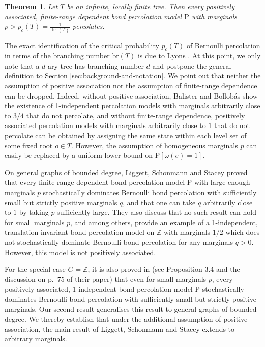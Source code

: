 \documentclass[11pt]{article}
\renewcommand{\P}{\mathrm{P}}
\newcommand{\Z}{\mathbb{Z}}
\DeclareMathOperator{\br}{br}
\newtheorem{theorem}{Theorem}
\theoremstyle{remark}
\begin{document}
\begin{theorem}\label{thm:trees}
	Let $T$ be an infinite, locally finite tree. Then every positively associated, finite-range dependent bond percolation model $\P$ with marginals $p>p_c(T) = \frac{1}{\br(T)}$ percolates.
\end{theorem}
The exact identification of the critical probability $p_c(T)$ of Bernoulli percolation in terms of the branching number $\text{br}(T)$ is due to Lyons \cite{Lyons1990}. At this point, we only note that a $d$-ary tree has branching number $d$ and postpone the general definition to Section \ref{sec:background-and-notation}.
We point out that neither the assumption of positive association nor the assumption of finite-range dependence can be dropped. Indeed, without positive association, Balister and Bollobás \cite{Balister2012} show the existence of 1-independent percolation models with marginals arbitrarily close to $3/4$ that do not percolate, and without finite-range dependence, positively associated percolation models with marginals arbitrarily close to $1$ that do not percolate can be obtained by assigning the same state within each level set of some fixed root $o\in T$. However, the assumption of homogeneous marginals $p$ can easily be replaced by a uniform lower bound on $\mathrm{P}[\omega(e)=1]$.

On general graphs of bounded degree, Liggett, Schonmann and Stacey \cite{Liggett1997} proved that every finite-range dependent bond percolation model $\P$ with large enough marginals $p$ stochastically dominates Bernoulli bond percolation with sufficiently small but strictly positive marginals $q$, and that one can take $q$ arbitrarily close to $1$ by taking $p$ sufficiently large. They also discuss that no such result can hold for small marginals $p$, and among others, provide an example of a 1-independent, translation invariant bond percolation model on $\Z$ with marginals $1/2$ which does not stochastically dominate Bernoulli bond percolation for any marginals $q>0$. However, this model is not positively associated. 

For the special case $G = \Z$, it is also proved in \cite{Liggett1997} (see Proposition 3.4 and the discussion on p.~75 of their paper) that even for small marginals $p$, every positively associated, 1-independent bond percolation model $\P$ stochastically dominates Bernoulli bond percolation with sufficiently small but strictly positive marginals. Our second result generalises this result to general graphs of bounded degree. We thereby establish that under the additional assumption of positive association, the main result of Liggett, Schonmann and Stacey extends to arbitrary marginals.
\end{document}
